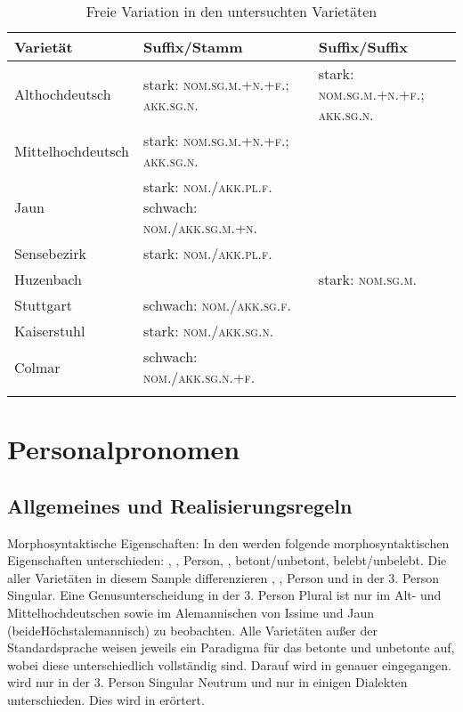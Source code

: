 \begin{table}
\caption{ Freie Variation in den untersuchten Varietäten}\label{table5.18}
\begin{tabularx}{\textwidth}{lQX}
\lsptoprule
Varietät & {Suffix}\slash Stamm & {Suffix}\slash {Suffix}\\\midrule
Althochdeutsch & stark: \textsc{nom.sg.m.+n.+f.}; \textsc{akk.sg.n.} & stark: \textsc{nom.sg.m.+n.+f.}; \textsc{akk.sg.n.}\\
Mittelhochdeutsch & stark: \textsc{nom.sg.m.+n.+f.}; \textsc{akk.sg.n.} & \\
Jaun & stark: \textsc{nom./akk.pl.f.} schwach: \textsc{nom./akk.sg.m.+n.} &  \\
Sensebezirk & stark: \textsc{nom./akk.pl.f.} & \\
Huzenbach & & stark: \textsc{nom.sg.m.} \\
Stuttgart & schwach: \textsc{nom./akk.sg.f.}  & \\
Kaiserstuhl & stark: \textsc{nom./akk.sg.n.} & \\
Colmar & schwach:    \textsc{nom./akk.sg.n.+f.} & \\
\lspbottomrule
\end{tabularx}
\end{table}



\section{Personalpronomen}\label{5.3}

\subsection{Allgemeines und Realisierungsregeln}\label{5.3.1}

{Morphosyntaktische Eigenschaften}: In den  werden folgende morphosyntaktischen Eigenschaften unterschieden: , , Person, , be\-tont/un\-be\-tont, be\-lebt/un\-be\-lebt. Die  aller Varietäten in diesem Sample differenzieren , , Person und  in der 3. Person Singular. Eine Genusunterscheidung in der 3. Person Plural ist nur im Alt- und Mittelhochdeutschen sowie im Alemannischen von Issime und Jaun (beide\pagebreak[4] Höchstalemannisch) zu beobachten. Alle Varietäten außer der Standardsprache weisen jeweils ein Paradigma für das betonte und unbetonte  auf, wobei diese unterschiedlich vollständig sind. Darauf wird in  genauer eingegangen.  wird nur in der 3. Person Singular Neutrum und nur in einigen Dialekten unterschieden. Dies wird in  erörtert.

